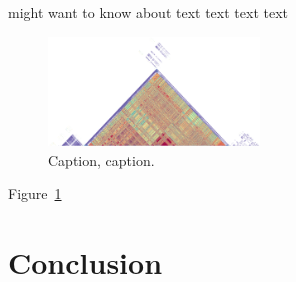 \documentclass{bioinfo}
\begin{document}
\citealp{Boffelli03} might want to know about  text text text text




\begin{figure}[!tpb]%
\centerline{\includegraphics[width=0.5\textwidth,keepaspectratio]{../images/chr8.png}}
\caption{Caption, caption.}\label{fig:01}
\end{figure}
Figure~\ref{fig:01} 






%
%






\section{Conclusion}
\end{document}
